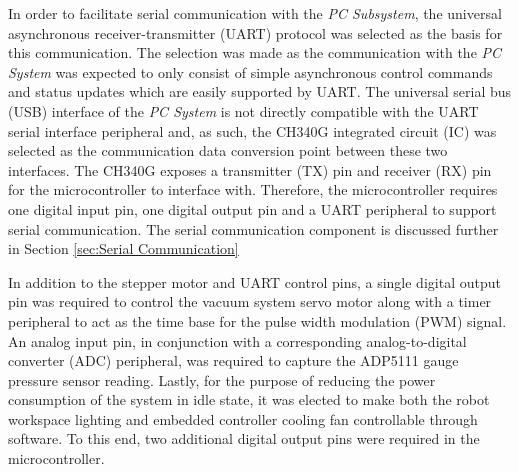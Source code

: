 
In order to facilitate serial communication with the \textit{PC Subsystem}, the universal asynchronous receiver-transmitter (UART) protocol was selected as the basis for this communication. The selection was made as the communication with the \textit{PC System} was expected to only consist of simple asynchronous control commands and status updates which are easily supported by UART. The universal serial bus (USB) interface of the \textit{PC System} is not directly compatible with the UART serial interface peripheral and, as such, the CH340G integrated circuit (IC) was selected as the communication data conversion point between these two interfaces. The CH340G exposes a transmitter (TX) pin and receiver (RX) pin for the microcontroller to interface with. Therefore, the microcontroller requires one digital input pin, one digital output pin and a UART peripheral to support serial communication. The serial communication component is discussed further in Section \ref{sec:Serial Communication}

In addition to the stepper motor and UART control pins, a single digital output pin was required to control the vacuum system servo motor along with a timer peripheral to act as the time base for the pulse width modulation (PWM) signal. An analog input pin, in conjunction with a corresponding analog-to-digital converter (ADC) peripheral, was required to capture the ADP5111 gauge pressure sensor reading. Lastly, for the purpose of reducing the power consumption of the system in idle state, it was elected to make both the robot workspace lighting and embedded controller cooling fan controllable through software. To this end, two additional digital output pins were required in the microcontroller.


